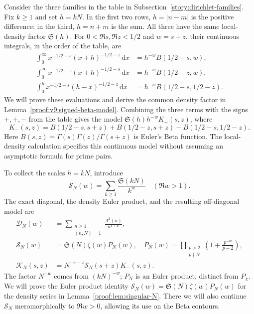 \documentclass[12pt,a4paper]{amsart}
\numberwithin{equation}{section}
\def\ge{\geqslant}
\theoremstyle{plain}
\theoremstyle{definition}
\theoremstyle{remark}
\begin{document}
Consider the three families in the table in
Subsection~\ref{story:dirichlet-families}. Fix $k\ge1$ and set $h=kN$.
In the first two rows, $h=|n-m|$ is the positive difference; in the
third, $h=n+m$ is the sum. All three have the same local-density
factor $\mathfrak S(h)$. For $0<\Re s,\Re z<1/2$ and $w=s+z$,
their continuous integrals, in the order of the table, are
\[
 \begin{aligned}
 \int_0^\infty x^{-1/2-s}(x+h)^{-1/2-z}\,\mathrm{d}x
    &=h^{-w}B(1/2-s,w),\\
 \int_0^\infty x^{-1/2-z}(x+h)^{-1/2-s}\,\mathrm{d}x
    &=h^{-w}B(1/2-z,w),\\
 \int_0^h x^{-1/2-s}(h-x)^{-1/2-z}\,\mathrm{d}x
    &=h^{-w}B(1/2-s,1/2-z).
 \end{aligned}
\]
We will prove these evaluations and derive the common density factor
in Lemma~\ref{proof:v9:signed-beta-model}. Combining the three terms
with the signs $+,+,-$ from the table gives the model
$\mathfrak S(h)h^{-w}K_-(s,z)$, where
\begin{equation}\label{eq:beta-kernel}
 K_-(s,z)=B(1/2-s,s+z)+B(1/2-z,s+z)
                         -B(1/2-s,1/2-z).
\end{equation}
Here $B(s,z)=\Gamma(s)\Gamma(z)/\Gamma(s+z)$ is Euler's Beta function.
The local-density calculation specifies this continuous model without
assuming an asymptotic formula for prime pairs.

To collect the scales $h=kN$, introduce
\begin{equation}\label{v3i:series}
 \mathscr S_N(w)=\sum_{k\ge1}\frac{\mathfrak S(kN)}{k^w}
 \quad(\Re w>1).
\end{equation}
The exact diagonal, the density Euler product, and the resulting
off-diagonal model are
\begin{equation}\label{eq:goldbach-arithmetic-kernels}
 \begin{aligned}
 {\mathscr D}_N(w)&=\sum_{\substack{n\ge1\\(n,N)=1}}
                           \frac{\Lambda^2(n)}{n^{1+w}},\\
 \mathscr S_N(w)&=\mathfrak S(N)\zeta(w)P_N(w),
 \quad P_N(w)=\prod_{\substack{p>2\\p\nmid N}}
                       \left(1+\frac{p^{-w}}{p-2}\right),\\
 {\mathscr K}_N(s,z)&=N^{-s-z}\mathscr S_N(s+z)K_-(s,z).
 \end{aligned}
\end{equation}
The factor $N^{-w}$ comes from $(kN)^{-w}$; $P_N$ is an Euler
product, distinct from $P_\chi$. We will prove the Euler product identity
$\mathscr S_N(w)=\mathfrak S(N)\zeta(w)P_N(w)$ for the density series
in Lemma~\ref{proof:lem:singular-N}. There we will also continue
$\mathscr S_N$ meromorphically to $\Re w>0$, allowing its use on the
Beta contours.
\end{document}
